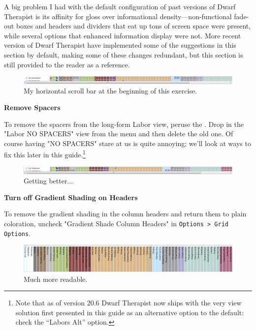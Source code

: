 \documentclass[]{article}
\newcommand{\legacy}[1] {
\begin{center}
\colorbox{legacy-content}{
\begin{minipage}[t]{0.95\linewidth}
#1
\end{minipage}
}
\end{center}
}
\begin{document}
\legacy{
A big problem I had with the default configuration of past versions of Dwarf Therapist is its affinity
for gloss over informational density---non-functional fade-out boxes and headers and dividers that eat
up tons of screen space were present, while several options that enhanced information display were not.
More recent version of Dwarf Therapist have implemented some of the suggestions in this section by
default, making some of these changes redundant, but this section is still provided to the reader as a
reference. }


\begin{figure}[h!] \centering
\includegraphics[width=\linewidth]{Sec2Fig18}
\caption{My horizontal scroll bar at the beginning of this exercise.}
\end{figure}

\noindent \textbf{Remove Spacers}

To remove the spacers from the long-form Labor view, peruse the \textbf{}. Drop
in the "Labor NO SPACERS" view from the menu and then delete the old one. Of course having "NO SPACERS"
stare at us is quite annoying; we'll look at ways to fix this later in this guide.\footnote{Note that as
of version 20.6 Dwarf Therapist now ships with the very view solution first presented in this guide as
an alternative option to the default: check the ``Labors Alt'' option.} \begin{figure}[h!]
\centering
\includegraphics[width=\linewidth]{Sec2Fig19}
\caption{Getting better...}
\end{figure}

\noindent \textbf{Turn off Gradient Shading on Headers}

To remove the gradient shading in the column headers and return them to plain coloration, uncheck
"Gradient Shade Column Headers" in \texttt{Options > Grid Options}.
\begin{figure}[h!] \centering
\includegraphics[width=\linewidth]{Sec2Fig20}
\caption{Much more readable.}
\end{figure}
\end{document}
